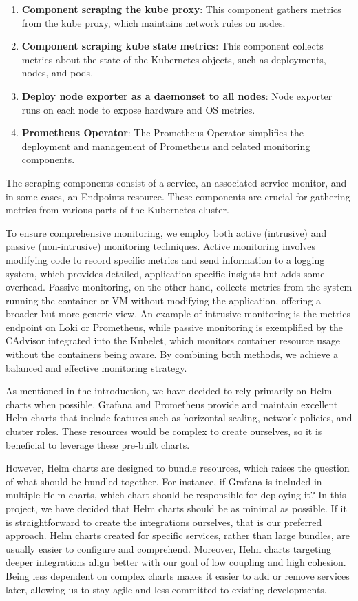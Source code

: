 \begin{enumerate}
    \item \textbf{Component scraping the kube proxy}: This component gathers metrics from the kube proxy, which maintains network rules on nodes.
    \item \textbf{Component scraping kube state metrics}: This component collects metrics about the state of the Kubernetes objects, such as deployments, nodes, and pods.
    \item \textbf{Deploy node exporter as a daemonset to all nodes}: Node exporter runs on each node to expose hardware and OS metrics.
    \item \textbf{Prometheus Operator}: The Prometheus Operator simplifies the deployment and management of Prometheus and related monitoring components.
\end{enumerate}

The scraping components consist of a service, an associated service monitor, and in some cases, an Endpoints resource. These components are crucial for gathering metrics from various parts of the Kubernetes cluster.

To ensure comprehensive monitoring, we employ both active (intrusive) and passive (non-intrusive) monitoring techniques. Active monitoring involves modifying code to record specific metrics and send information to a logging system, which provides detailed, application-specific insights but adds some overhead. Passive monitoring, on the other hand, collects metrics from the system running the container or VM without modifying the application, offering a broader but more generic view. An example of intrusive monitoring is the metrics endpoint on Loki or Prometheus, while passive monitoring is exemplified by the CAdvisor integrated into the Kubelet, which monitors container resource usage without the containers being aware. By combining both methods, we achieve a balanced and effective monitoring strategy.

As mentioned in the introduction, we have decided to rely primarily on Helm charts when possible. Grafana and Prometheus provide and maintain excellent Helm charts that include features such as horizontal scaling, network policies, and cluster roles. These resources would be complex to create ourselves, so it is beneficial to leverage these pre-built charts.

However, Helm charts are designed to bundle resources, which raises the question of what should be bundled together. For instance, if Grafana is included in multiple Helm charts, which chart should be responsible for deploying it? In this project, we have decided that Helm charts should be as minimal as possible. If it is straightforward to create the integrations ourselves, that is our preferred approach. Helm charts created for specific services, rather than large bundles, are usually easier to configure and comprehend. Moreover, Helm charts targeting deeper integrations align better with our goal of low coupling and high cohesion. Being less dependent on complex charts makes it easier to add or remove services later, allowing us to stay agile and less committed to existing developments.

